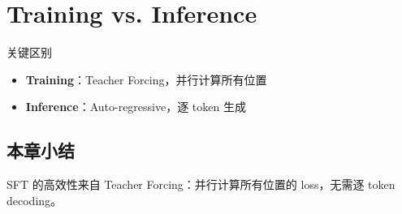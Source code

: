 \section{Training vs. Inference}
\begin{warningbox}{关键区别}
\begin{itemize}
  \item \textbf{Training}：Teacher Forcing，并行计算所有位置
  \item \textbf{Inference}：Auto-regressive，逐 token 生成
\end{itemize}
\end{warningbox}

\subsection{本章小结}
SFT 的高效性来自 Teacher Forcing：并行计算所有位置的 loss，无需逐 token decoding。

\newpage
